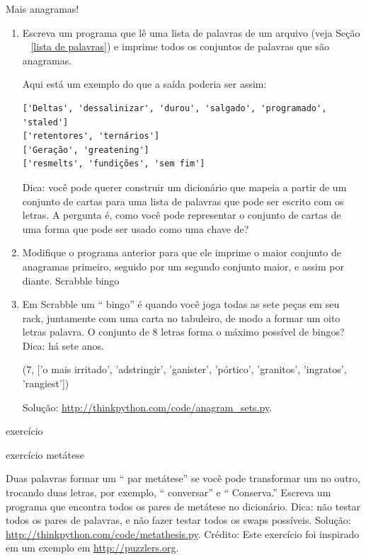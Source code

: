 \documentclass[10pt]{book}
\begin{document}
\begin{v erbatim}
\begin{}
Mais anagramas!

\begin{enumerate}

\item Escreva um programa
que lê uma lista de palavras de um arquivo (veja Seção ~ \ref {lista de palavras}) e
imprime todos os conjuntos de palavras que são anagramas.

Aqui está um exemplo do que a saída poderia ser assim:

\begin{verbatim}
['Deltas', 'dessalinizar', 'durou', 'salgado', 'programado', 'staled']
['retentores', 'ternários']
['Geração', 'greatening']
['resmelts', 'fundições', 'sem fim']
\end{verbatim}
%
Dica: você pode querer construir um dicionário que mapeia a partir de um
conjunto de cartas para uma lista de palavras que pode ser escrito com os
letras. A pergunta é, como você pode representar o conjunto de
cartas de uma forma que pode ser usado como uma chave de?

\item Modifique o programa anterior para que ele imprime o maior conjunto
de anagramas primeiro, seguido por um segundo conjunto maior, e assim por diante.
\index{} Scrabble
\index{} bingo

\item Em Scrabble um `` bingo'' é quando você joga todas as sete peças em
seu rack, juntamente com uma carta no tabuleiro, de modo a formar um oito letras
palavra. O conjunto de 8 letras forma o máximo possível de bingos?
Dica: há sete anos.

(7, ['o mais irritado', 'adstringir', 'ganister', 'pórtico', 'granitos',
'ingratos', 'rangiest'])

Solução: \url{http://thinkpython.com/code/anagram_sets.py}.

\end{enumerate}
\end{} exercício

\begin{} exercício
\index{} metátese

Duas palavras formar um `` par metátese'' se você pode transformar um no
outro, trocando duas letras, por exemplo, `` conversar'' e
`` Conserva.'' Escreva um programa que encontra todos os pares de metátese
no dicionário. Dica: não testar todos os pares de palavras, e não fazer
testar todos os swaps possíveis. Solução: \url{http://thinkpython.com/code/metathesis.py}.
Crédito: Este exercício foi inspirado em um exemplo em \url{http://puzzlers.org}.


\end{}
\end{v erbatim}
\end{document}
